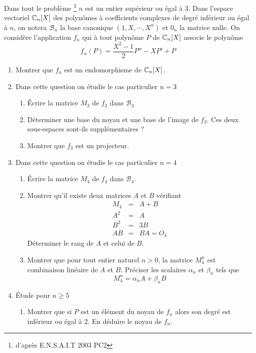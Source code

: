 Dans tout le problème \footnote{d'après E.N.S.A.I.T 2003 PC2} $n$ est un entier supérieur ou égal à 3. Dans l'espace vectoriel $\mathbb{C}_n[X]$ des polynômes à coefficients complexes de degré inférieur ou égal à $n$, on notera $\mathcal{B}_n$ la base canonique $(1,X, \cdots,X^n)$ et $0_n$ la matrice nulle. On considère l'application $f_n$ qui à tout polynôme $P$ de $\mathbb{C}_n[X]$ associe le polynôme
\[f_n(P)=\frac{X^2-1}{2}P'' -XP'+P\]
\begin{enumerate}
\item Montrer que $f_n$ est un endomorphisme de $\mathbb{C}_n[X]$.
\item Dans cette question on étudie le cas particulier $n=3$
   \begin{enumerate}
      \item {\'E}crire la matrice $M_3$ de $f_3$ dans $\mathcal{B}_3$
      \item Déterminer une base du noyau et une base de l'image de $f_3$. Ces deux sous-espaces sont-ils supplémentaires ?
      \item Montrer que $f_3$ est un projecteur.
    \end{enumerate}
\item Dans cette question on étudie le cas particulier $n=4$
   \begin{enumerate}
       \item {\'E}crire la matrice $M_4$ de $f_4$ dans $\mathcal{B}_4$.
       \item Montrer qu'il existe deux matrices $A$ et $B$ vérifiant
         \begin{eqnarray*}
	 M_4 &=& A+B \\
	 A^2 &=& A \\
	 B^2 &=& 3B \\
	 AB &=& BA = O_4
         \end{eqnarray*}
          Déterminer le rang de $A$ et celui de $B$.
       \item Montrer que pour tout entier naturel $n>0$, la matrice $M_4^n$ est combinaison linéaire de $A$ et $B$. Préciser les scalaires $\alpha_n$ et $\beta_n$ tels que
       \[M_4^n=\alpha_n A + \beta_n B\]
   \end{enumerate}
\item {\'E}tude pour $n\geq 5$
    \begin{enumerate}
       \item Montrer que si $P$ est un élément du noyau de $f_n$ alors son degré est inférieur ou égal à 2. En déduire le noyau de $f_n$.

\end{enumerate}
\end{enumerate}

